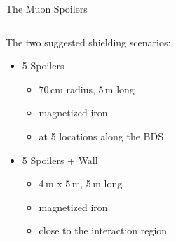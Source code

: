\documentclass[xcolor={dvipsnames}]{beamer}
\begin{document}
\begin{frame}{The Muon Spoilers}
\begin{columns}
 \begin{column}{0.4\textwidth}
 The two suggested shielding scenarios:
  \begin{itemize}
   \item 5 Spoilers
   \begin{itemize}
    \item 70\,cm radius, 5\,m long
    \item magnetized iron
    \item at 5 locations along the BDS
   \end{itemize}
   \item 5 Spoilers + Wall
    \begin{itemize}
    \item 4\,m x 5\,m, 5\,m long
    \item magnetized iron
    \item close to the interaction region
   \end{itemize}
  \end{itemize}

 \end{column}
 \begin{column}{0.6\textwidth}
  \\\vspace*{0.3cm}
 \end{column}
\end{columns} 
\end{frame}
\end{document}
